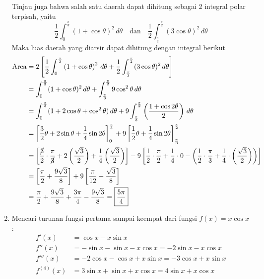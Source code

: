 \documentclass[11pt,openany,a4paper]{article}
\begin{document}
\begin{enumerate}
        Tinjau juga bahwa salah satu daerah dapat dihitung sebagai 2 integral polar terpisah, yaitu
        \[ \frac{1}{2}\int_{0}^{\frac{\pi}{3}} \left(1+\cos\theta\right)^2 \, d\theta \quad\text{dan}\quad \frac{1}{2}\int_{\frac{\pi}{3}}^{\frac{\pi}{2}} \left(3\cos\theta\right)^2 \, d\theta \]
        Maka luas daerah yang diarsir dapat dihitung dengan integral berikut
        \begin{align*}
            \text{Area} &= 2\left[\frac{1}{2}\int_{0}^{\frac{\pi}{3}} \left(1+\cos\theta\right)^2 \, d\theta + \frac{1}{2}\int_{\frac{\pi}{3}}^{\frac{\pi}{2}} (3\cos\theta)^2 \, d\theta\right]\\
            &= \int_{0}^{\frac{\pi}{3}} (1+\cos\theta)^2 \, d\theta + \int_{\frac{\pi}{3}}^{\frac{\pi}{2}} 9\cos^2\theta \, d\theta\\
            &= \int_{0}^{\frac{\pi}{3}} (1 + 2\cos\theta + \cos^2\theta) \, d\theta + 9\int_{\frac{\pi}{3}}^{\frac{\pi}{2}} \left(\frac{1+\cos 2\theta}{2}\right) \, d\theta\\
            &= \left[\frac{3}{2}\theta + 2\sin\theta + \frac{1}{4}\sin 2\theta\right]_{0}^{\frac{\pi}{3}} + 9\left[\frac{1}{2}\theta + \frac{1}{4}\sin 2\theta\right]_{\frac{\pi}{3}}^{\frac{\pi}{2}}\\
            &= \left[\frac{\cancel{3}}{2}\cdot\frac{\pi}{\cancel{3}} + 2\left(\frac{\sqrt{3}}{2}\right) + \frac{1}{4}\left(\frac{\sqrt{3}}{2}\right)\right] - 9\left[\frac{1}{2}\cdot\frac{\pi}{2} + \frac{1}{4}\cdot 0 - \left(\frac{1}{2}\cdot\frac{\pi}{3} + \frac{1}{4}\cdot\left(\frac{\sqrt{3}}{2}\right)\right)\right]\\
            &= \left[\frac{\pi}{2} + \frac{9\sqrt{3}}{8}\right] + 9\left[\frac{\pi}{12} - \frac{\sqrt{3}}{8}\right]\\
            &= \frac{\pi}{2} + \frac{9\sqrt{3}}{8} + \frac{3\pi}{4} - \frac{9\sqrt{3}}{8}= \boxed{\frac{5\pi}{4}}
        \end{align*}
      \item Mencari turunan fungsi pertama sampai keempat dari fungsi \( f(x) = x \cos x \):
        \begin{align*}
            f'(x) &= \cos x - x\sin x\\
            f''(x) &= -\sin x - \sin x - x\cos x = -2\sin x - x\cos x\\
            f'''(x) &= -2\cos x - \cos x + x\sin x = -3\cos x + x\sin x\\
            f^{(4)}(x) &= 3\sin x + \sin x + x\cos x = 4\sin x + x\cos x 
        \end{align*}

\end{enumerate}
\end{document}
